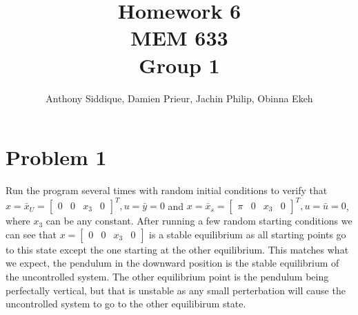 \documentclass{article}
\author{Anthony Siddique, Damien Prieur, Jachin Philip, Obinna Ekeh}
\title{Homework 6\\ MEM 633 \\ Group 1}
\date{}
\begin{document}
\maketitle

\section*{Problem 1}
Run the program several times with random initial conditions to verify that
$x = \bar{x}_U = \begin{bmatrix} 0 & 0 & x_3 & 0 \end{bmatrix}^T, u = \bar{y} = 0$
and $x = \bar{x}_s = \begin{bmatrix} \pi & 0 & x_3 & 0 \end{bmatrix}^T, u = \bar{u} = 0$,
where $x_3$ can be any constant.
\newline
\newline
After running a few random starting conditions we can see that
$ x = \begin{bmatrix} 0 & 0 & x_3 & 0 \end{bmatrix} $
is a stable equilibrium as all starting points go to this state except the one starting at the other equilibrium.
This matches what we expect, the pendulum in the downward position is the stable equilibrium of the uncontrolled system.
The other equilibrium point is the pendulum being perfectally vertical, but that is unstable as any small perterbation will cause the uncontrolled system to go to the other equilibirum state.
\end{document}
